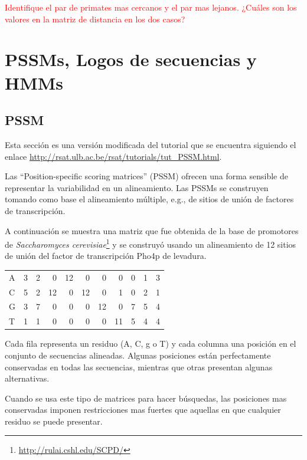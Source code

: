 \documentclass[letter,11pt]{book}
\begin{document}
\textcolor{red}{Identifique el par de primates mas cercanos y el par mas lejanos. ¿Cuáles son los valores en la matriz de distancia en los dos casos?}

\chapter{PSSMs, Logos de secuencias y HMMs}

\section{PSSM}

Esta sección es una versión modificada del tutorial que se encuentra siguiendo el enlace \url{http://rsat.ulb.ac.be/rsat/tutorials/tut_PSSM.html}.

Las ``Position-specific scoring matrices'' (PSSM) ofrecen una forma sensible de representar la variabilidad en un alineamiento. Las PSSMs se construyen tomando como base el alineamiento múltiple, e.g., de sitios de unión de factores de transcripción.

A continuación se muestra una matriz que fue obtenida de la base de promotores de \textit{Saccharomyces cerevisiae}\footnote{\url{http://rulai.cshl.edu/SCPD/}} y se construyó usando un alineamiento de 12 sitios de unión del factor de transcripción Pho4p de levadura.

\vskip5pt
\begin{center}
\begin{tabular}{l|r r r r r r r r r r }
A &  3 &  2 &  0 & 12 &  0 &  0 &  0 &  0 &  1 &  3\\
C &  5 &  2 & 12 &  0 & 12 &  0 &  1 &  0 &  2 &  1\\
G &  3 &  7 &  0 &  0 &  0 & 12 &  0 &  7 &  5 &  4\\
T &  1 &  1 &  0 &  0 &  0 &  0 & 11 &  5 &  4 &  4\\
\end{tabular}
\end{center}

Cada fila representa un residuo (A, C, g o T) y cada columna una posición en el conjunto de secuencias alineadas. Algunas posiciones están perfectamente conservadas en todas las secuencias, mientras que otras presentan algunas alternativas.

Cuando se usa este tipo de matrices para hacer búsquedas, las posiciones mas conservadas imponen restricciones mas fuertes que aquellas en que cualquier residuo se puede presentar.
\end{document}
